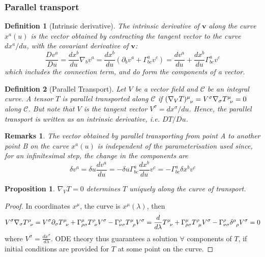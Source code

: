 \documentclass[a4paper]{article}
\newtheorem{remarks}{Remarks}[section]
\theoremstyle{new}
\newtheorem{defi}{Definition}[section]
\newtheorem{prop}{Proposition}[section]
\begin{document}
\subsubsection{Parallel transport}
\begin{defi}[Intrinsic derivative]
The intrinsic derivative of $\mathbf{v}$ along the curve $x^a(u)$ is the vector obtained by contracting the tangent vector to the curve $dx^a/du$, with the covariant derivative of $\mathbf{v}$:
$$\frac{Dv^a}{Du}=\frac{dx^b}{du}\nabla_bv^a=\frac{dx^b}{du}(\partial_bv^a+\Gamma_{bc}^av^c)=\frac{dv^a}{du}+\frac{dx^b}{du}\Gamma_{bc}^av^c$$
which includes the connection term, and do form the components of a vector.
\end{defi}
\begin{defi}[Parallel Transport]
Let $V$ be a vector field and $\mathcal{C}$ be an integral curve. A tensor $T$ is parallel transported along $\mathcal{C}$ if $\tensor*{(\nabla_VT)}{*_{}^{\mu}_{\nu}}=V^\sigma\nabla_\sigma\tensor*{T}{*_{}^{\mu}_{\nu}}=0$ along $\mathcal{C}$. But note that $V$ is the tangent vector $V^\sigma=dx^\sigma/du$. Hence, the parallel transport is written as an intrinsic derivative, i.e. $DT/Du$.
\end{defi}
\begin{remarks}
The vector obtained by parallel transporting from point A to another point B on the curve $x^a(u)$ is independent of the parameterisation used since, for an infinitesimal step, the change in the components are
$$\delta v^a=\delta u\frac{dv^a}{du}=-\delta u\Gamma^a_{bc}\frac{dx^b}{du}v^c=-\Gamma^a_{bc}\delta x^bv^c$$
\end{remarks}
\begin{prop}
$\nabla_VT=0$ determines $T$ uniquely along the curve of transport.
\end{prop}
\begin{proof}
In coordinates $x^\mu$, the curve is $x^\mu(\lambda)$, then
$$V^\sigma\nabla_\sigma \tensor*{T}{*_{}^{\mu}_{\nu}}=V^\sigma\partial_\sigma \tensor*{T}{*_{}^{\mu}_{\nu}}+\Gamma_{\rho\sigma}^\mu \tensor*{T}{*_{}^{\rho}_{\nu}}V^\sigma-\Gamma_{\nu\sigma}^\rho \tensor*{T}{*_{}^{\mu}_{\rho}}V^\sigma=\frac{d}{d\lambda}\tensor*{T}{*_{}^{\mu}_{\nu}}+\Gamma_{\rho\sigma}^\mu\tensor*{T}{*_{}^{\rho}_{\mu}}V^\sigma-\Gamma_{\nu\sigma}^\rho \tensor*{\delta}{*_{}^{\mu}_{\rho}}V^\sigma=0$$
where $V^\sigma=\frac{dx^\sigma}{d\lambda}$. ODE theory thus guarantees a solution $\forall$ components of $T$, if initial conditions are provided for $T$ at some point on the curve.
\end{proof}
\end{document}
